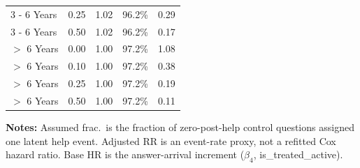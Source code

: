 \begin{table}[H]
\begin{tabular}{@{}lrrrr@{}}
3 - 6 Years & 0.25 & 1.02 & 96.2\% & 0.29 \\
3 - 6 Years & 0.50 & 1.02 & 96.2\% & 0.17 \\
$>$ 6 Years & 0.00 & 1.00 & 97.2\% & 1.08 \\
$>$ 6 Years & 0.10 & 1.00 & 97.2\% & 0.38 \\
$>$ 6 Years & 0.25 & 1.00 & 97.2\% & 0.19 \\
$>$ 6 Years & 0.50 & 1.00 & 97.2\% & 0.11 \\
\bottomrule
\end{tabular}
\vspace{0.35em}
\begin{minipage}{\linewidth}
\footnotesize
\raggedright
\textbf{Notes:} Assumed frac.\ is the fraction of zero-post-help control questions assigned one latent help event. Adjusted RR is an event-rate proxy, not a refitted Cox hazard ratio. Base HR is the answer-arrival increment ($\beta_4$, is\_treated\_active).
\end{minipage}
\end{table}
